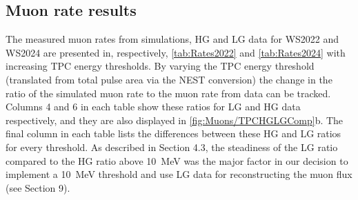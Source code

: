\subsection{Muon rate results}\label{sec:Muons/MuonRateResults}
The measured muon rates from simulations, HG and LG data for WS2022 and WS2024 are presented in, respectively, \autoref{tab:Rates2022} and \autoref{tab:Rates2024} with increasing TPC energy thresholds. By varying the TPC energy threshold (translated from total pulse area via the NEST conversion) the change in the ratio of the simulated muon rate to the muon rate from data can be tracked. Columns 4 and 6 in each table show these ratios for LG and HG data respectively, and they are also displayed in \autoref{fig:Muons/TPCHGLGComp}b. The final column in each table lists the differences between these HG and LG ratios for every threshold. As described in Section 4.3, the steadiness of the LG ratio compared to the HG ratio above 10~MeV was the major factor in our decision to implement a 10~MeV threshold and use LG data for reconstructing the muon flux (see Section 9).

